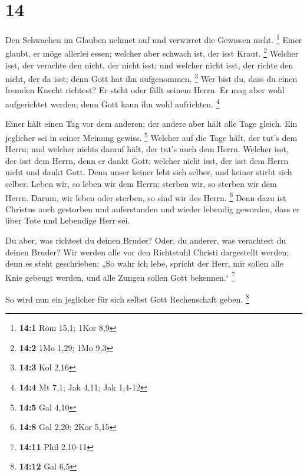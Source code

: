 \hypertarget{section-4}{%
\section{14}\label{section-4}}

 Den Schwachen im Glauben nehmet auf und verwirret die
Gewissen nicht. \footnote{\textbf{14:1} Röm 15,1; 1Kor 8,9} 
Einer glaubt, er möge allerlei essen; welcher aber schwach ist, der isst
Kraut. \footnote{\textbf{14:2} 1Mo 1,29; 1Mo 9,3}  Welcher
isst, der verachte den nicht, der nicht isst; und welcher nicht isst,
der richte den nicht, der da isst; denn Gott hat ihn aufgenommen.
\footnote{\textbf{14:3} Kol 2,16}  Wer bist du, dass du
einen fremden Knecht richtest? Er steht oder fällt seinem Herrn. Er mag
aber wohl aufgerichtet werden; denn Gott kann ihn wohl aufrichten.
\footnote{\textbf{14:4} Mt 7,1; Jak 4,11; Jak 1,4-12}

 Einer hält einen Tag vor dem anderen; der andere aber hält
alle Tage gleich. Ein jeglicher sei in seiner Meinung gewiss.
\footnote{\textbf{14:5} Gal 4,10}  Welcher auf die Tage
hält, der tut's dem Herrn; und welcher nichts darauf hält, der tut's
auch dem Herrn. Welcher isst, der isst dem Herrn, denn er dankt Gott;
welcher nicht isst, der isst dem Herrn nicht und dankt Gott.
 Denn unser keiner lebt sich selber, und keiner stirbt sich
selber.  Leben wir, so leben wir dem Herrn; sterben wir, so
sterben wir dem Herrn. Darum, wir leben oder sterben, so sind wir des
Herrn. \footnote{\textbf{14:8} Gal 2,20; 2Kor 5,15}  Denn
dazu ist Christus auch gestorben und auferstanden und wieder lebendig
geworden, dass er über Tote und Lebendige Herr sei.

 Du aber, was richtest du deinen Bruder? Oder, du anderer,
was verachtest du deinen Bruder? Wir werden alle vor den Richtstuhl
Christi dargestellt werden;  denn es steht geschrieben: „So
wahr ich lebe, spricht der Herr, mir sollen alle Knie gebeugt werden,
und alle Zungen sollen Gott bekennen.`` \footnote{\textbf{14:11} Phil
  2,10-11}

 So wird nun ein jeglicher für sich selbst Gott
Rechenschaft geben. \footnote{\textbf{14:12} Gal 6,5}

